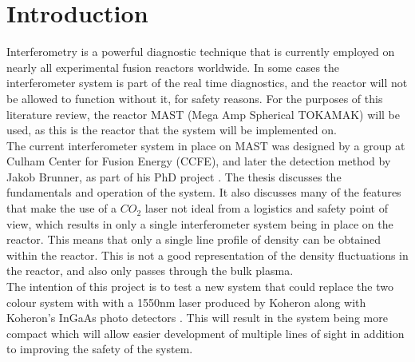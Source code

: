 \documentclass[12pt,a4paper,oneside]{report}
\begin{document}


\chapter{Introduction}
Interferometry is a powerful diagnostic technique that is currently employed on nearly all experimental fusion reactors worldwide. In some cases the interferometer system is part of the real time diagnostics, and the reactor will not be allowed to function without it, for safety reasons. For the purposes of this literature review, the reactor MAST (Mega Amp Spherical TOKAMAK) will be used, as this is the reactor that the system will be implemented on.\\
The current interferometer system in place on MAST was designed by a group at Culham Center for Fusion Energy (CCFE), and later the detection method by Jakob Brunner, as part of his PhD project \cite{Brunner2017}. The thesis discusses the fundamentals and operation of the system. It also discusses many of the features that make the use of a $CO_{2}$ laser not ideal from a logistics and safety point of view, which results in only a single interferometer system being in place on the reactor. This means that only a single line profile of density can be obtained within the reactor. This is not a good representation of the density fluctuations in the reactor, and also only passes through the bulk plasma.\\
The intention of this project is to test a new system that could replace the two colour system with with a 1550nm laser produced by Koheron \cite{KoheronLaserV1} along with Koheron's InGaAs photo detectors \cite{KoheronPD100Photodetector}. This will result in the system being more compact which will allow easier development of multiple lines of sight in addition to improving the safety of the system. %
\end{document}
